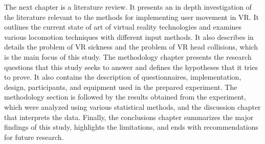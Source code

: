 The next chapter is a literature review. It presents an in depth investigation of the literature relevant to the methods for implementing user movement in VR. It outlines the current state of art of virtual reality technologies and examines various locomotion techniques with different input methods. It also describes in details the problem of VR sickness and the problem of VR head collisions, which is the main focus of this study. The methodology chapter presents the research questions that this study seeks to answer and defines the hypotheses that it tries to prove. It also contains the description of questionnaires, implementation, design, participants, and equipment used in the prepared experiment. The methodology section is followed by the results obtained from the experiment, which were analyzed using various statistical methods, and the discussion chapter that interprets the data. Finally, the conclusions chapter summarizes the major findings of this study, highlights the limitations, and ends with recommendations for future research.